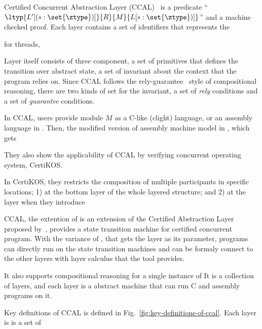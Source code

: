 Certified Concurrent Abstraction Layer (CCAL)~
is a predicate ``$\ltyp{L'[(s : \set{\ztype})]}{R}{M}{L[s : \set{\ztype})]}$'' and a machine checked proof. 
Each  layer contains a set 
of identifiers that represents the 

for threads, 


Layer itself consists of three component, a set of primitives that defines the transition over abstract state, 
a set of invariant about the context that the program relies on. 
Since CCAL follows the rely-guarantee~ style of compositional reasoning, 
there are two kinds of set for the invariant, a set of \textit{rely} conditions and a set of \textit{guarantee} conditions. 

In CCAL, users provide module $M$ as a C-like (clight) language, or an assembly language in \compcertkwd. 
Then, the modified version of assembly machine model in \compcertkwd, which gets 




They also show the applicability of CCAL by verifying concurrent operating system, CertiKOS.

In CertiKOS,
they restricts the composition of multiple participants in specific locations;
1) at the bottom layer of the whole layered structure; and 2) 
at the layer when they introduce 




CCAL, the extention of is an extension of the  Certified Abstraction Layer proposed by~\cite{deepspec}, 
provides a state transition machine for certified concurrent program.
With the variance of \compcertkwd, that gets the layer as its parameter, 
programs can directly run on the state transition machines and can be formaly connect to the 
other layers 
with layer calculus that the tool provides. 

It also supports 
compositional reasoning for a single instance of 
It is a collection of layers, and each layer 
is a abstract machine that can run C and assembly programs on it. 

Key definitions of CCAL is defined in Fig.~\ref{fig:key-definitions-of-ccal}. 
Each layer is is a set of 


